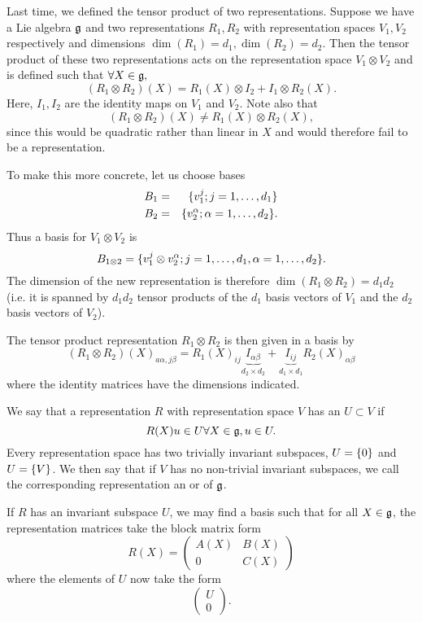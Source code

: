 Last time, we defined the tensor product of two representations. Suppose we have a Lie algebra $\mathfrak{g}$ and two representations $R_1,R_2$ with representation spaces $V_1,V_2$ respectively and dimensions $\dim(R_1)=d_1,\dim(R_2)=d_2$. Then the tensor product of these two representations acts on the representation space $V_1\otimes V_2$ and is defined such that $\forall X\in \mathfrak{g},$
$$(R_1\otimes R_2)(X)=R_1(X)\otimes I_2 + I_1 \otimes R_2(X).$$
Here, $I_1,I_2$ are the identity maps on $V_1$ and $V_2$.  Note also that
$$(R_1\otimes R_2)(X) \neq R_1(X) \otimes R_2(X),$$
since this would be quadratic rather than linear in $X$ and would therefore fail to be a representation.

To make this more concrete, let us choose bases
\begin{eqnarray*}
B_1&=&\{v_1^j; j=1,\ldots, d_1\}\\
B_2 &=&\{v_2^\alpha; \alpha = 1,\ldots, d_2\}.
\end{eqnarray*}
Thus a basis for $V_1 \otimes V_2$ is
$$B_{1\otimes 2}=\{v_1^j \otimes v_2^\alpha; j=1,\ldots, d_1, \alpha = 1,\ldots, d_2\}.$$
The dimension of the new representation is therefore $\dim(R_1 \otimes R_2) = d_1d_2$ (i.e. it is spanned by $d_1d_2$ tensor products of the $d_1$ basis vectors of $V_1$ and the $d_2$ basis vectors of $V_2$).

The tensor product representation $R_1\otimes R_2$ is then given in a basis by
$$(R_1\otimes R_2)(X)_{a\alpha, j \beta}=R_1(X)_{ij} \underbrace{I_{\alpha \beta}}_{d_2\times d_2} + \underbrace{I_{ij}}_{d_1\times d_1} R_2(X)_{\alpha \beta}$$
where the identity matrices have the dimensions indicated.

\begin{defn}
We say that a representation $R$ with representation space $V$ has an  $U\subset V$ if
$$R(X) u \in U \forall X\in \mathfrak{g}, u\in U.$$
Every representation space has two trivially invariant subspaces, $U=\{0\}$ and $U=\{V\}$. We then say that if $V$ has no non-trivial invariant subspaces, we call the corresponding representation an  or  of $\mathfrak{g}$.
\end{defn}

If $R$ has an invariant subspace $U$, we may find a basis such that for all $X\in \mathfrak{g}$, the representation matrices take the block matrix form
$$
R(X)=
\left(
\begin{array}{c|c}
A(X) & B(X) \\
\hline
0 & C(X)
\end{array}
\right)
$$
where the elements of $U$ now take the form
$$\left(\begin{array}{c}
U\\ \hline
0
\end{array}\right).$$

